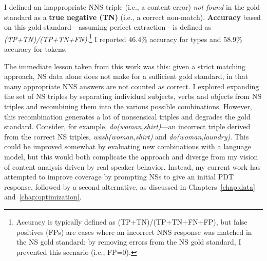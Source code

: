 I defined an inappropriate NNS triple (i.e., a content error)
\textit{not found} in the gold standard as a \textbf{true negative
  (TN)} (i.e., a correct non-match). \textbf{Accuracy} based on this
gold standard---assuming perfect extraction---is defined as
\textit{(TP+TN)/(TP+TN+FN)}.\footnote{Accuracy is typically defined as (TP+TN)/(TP+TN+FN+FP), but false positives (FPs) are cases where an incorrect NNS response was matched in the NS gold standard; by removing errors from the NS gold standard, I prevented this scenario (i.e., FP=0).} I reported 46.4\% accuracy for types and 58.9\% accuracy for tokens.

The immediate lesson taken from this work was this: given a strict matching approach, NS data alone does not make for a sufficient gold standard, in that many appropriate NNS answers are not counted as correct. I explored expanding the set of NS triples by separating individual subjects, verbs and objects from NS triples and recombining them into the various possible combinations. However, this recombination generates a lot of nonsensical triples and degrades the gold standard. Consider, for example, \textit{do(woman,shirt)}---an incorrect triple derived from the correct NS triples, \textit{wash(woman,shirt)} and \textit{do(woman,laundry)}. This could be improved somewhat by evaluating new combinations with a language model, but this would both complicate the approach and diverge from my vision of content analysis driven by real speaker behavior. Instead, my current work has attempted to improve coverage by prompting NSs to give an initial PDT response, followed by a second alternative, as discussed in Chapters~\ref{chap:data} and~\ref{chap:optimization}.

